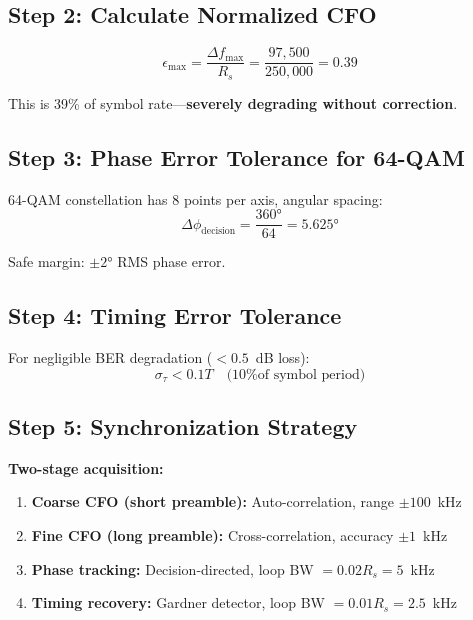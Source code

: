 \subsection*{Step 2: Calculate Normalized CFO}

\begin{equation}
\epsilon_{\max} = \frac{\Delta f_{\max}}{R_s} = \frac{97{,}500}{250{,}000} = 0.39
\end{equation}

This is 39\% of symbol rate---\textbf{severely degrading without correction}.

\subsection*{Step 3: Phase Error Tolerance for 64-QAM}

64-QAM constellation has 8 points per axis, angular spacing:
\begin{equation}
\Delta\phi_{\text{decision}} = \frac{360°}{64} = 5.625°
\end{equation}

Safe margin: $\pm 2°$ RMS phase error.

\subsection*{Step 4: Timing Error Tolerance}

For negligible BER degradation ($< 0.5$~dB loss):
\begin{equation}
\sigma_\tau < 0.1T \quad \text{(10\% of symbol period)}
\end{equation}

\subsection*{Step 5: Synchronization Strategy}

\textbf{Two-stage acquisition:}
\begin{enumerate}
\item \textbf{Coarse CFO (short preamble):} Auto-correlation, range $\pm 100$~kHz
\item \textbf{Fine CFO (long preamble):} Cross-correlation, accuracy $\pm 1$~kHz
\item \textbf{Phase tracking:} Decision-directed, loop BW $= 0.02 R_s = 5$~kHz
\item \textbf{Timing recovery:} Gardner detector, loop BW $= 0.01 R_s = 2.5$~kHz
\end{enumerate}

